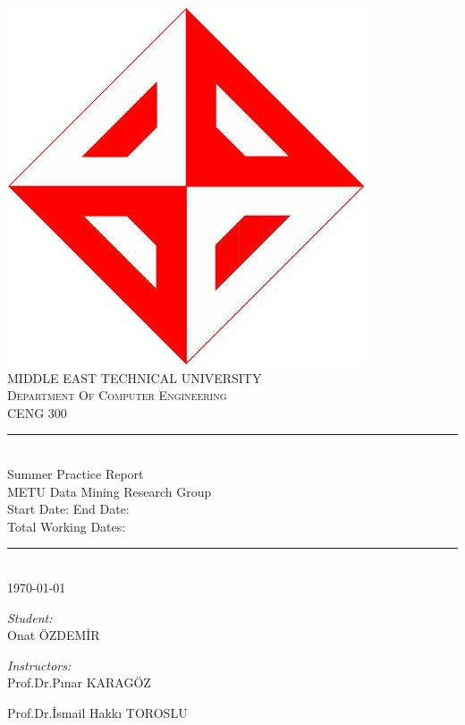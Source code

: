 \documentclass[12pt]{article}
\begin{document}
\begin{titlepage}
\newcommand{\HRule}{\rule{\linewidth}{0.1mm}} 
\center 
\includegraphics[scale=0.12]{ceng.jpg} \\
\vspace{1cm}
\textsc{\Large MIDDLE EAST TECHNICAL UNIVERSITY}\\[0.5cm]
\textsc{\large Department Of Computer Engineering}\\[0.5cm]
\textsc{\large CENG 300}\\
\HRule \\[0.4cm]
{ \huge \Large Summer Practice Report }\\[0.4cm]
METU Data Mining Research Group \\
Start Date: \hspace{25px}  End Date: \\
Total Working Dates:

\HRule \\[0.3cm]
{\today}\\[1.2cm]


\begin{minipage}{0.4\textwidth}
\begin{flushleft} \large

\emph{Student:}\\
Onat ÖZDEMİR
\end{flushleft}


\end{minipage}
\begin{minipage}{0.4\textwidth}
\begin{flushright} \large
\emph{Instructors:} \\
Prof.Dr.Pınar KARAGÖZ \\
\end{flushright}
\begin{flushright} \large
Prof.Dr.İsmail Hakkı TOROSLU \\
\end{flushright}
\end{minipage}\\[1cm]
\vspace{2cm}



\end{titlepage}
\end{document}
